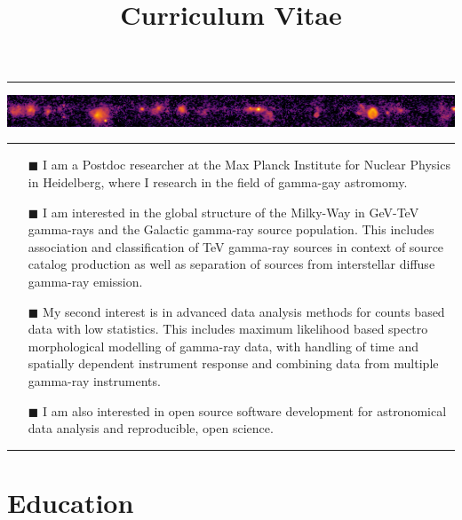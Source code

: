 \documentclass[11pt,a4paper,sans]{moderncv}        %
\title{Curriculum Vitae}                               %
\begin{document}
\makecvtitle

\centering\textcolor{color1}{\rule{\textwidth}{1pt}}
\vspace*{-11pt}\includegraphics[width=\textwidth]{galactic-plane}
\centering\textcolor{color1}{\rule{\textwidth}{1pt}}

\begin{multicols}{2}
\begin{itemize}
\item[\small\textcolor{color1}{$\blacksquare$}] I am a Postdoc researcher at the Max Planck Institute for Nuclear Physics in Heidelberg, where I research in the field of gamma-gay astromomy.
\item[\small\textcolor{color1}{$\blacksquare$}] I am interested in the global structure of the Milky-Way in GeV-TeV gamma-rays and the Galactic gamma-ray source population. This includes association and classification of TeV gamma-ray sources in context of source catalog production as well as separation of sources from interstellar diffuse gamma-ray emission.   
\item[\small\textcolor{color1}{$\blacksquare$}] My second interest is in advanced data analysis methods for counts based data with low statistics. This includes maximum likelihood based spectro morphological modelling of gamma-ray data, with handling of time and spatially dependent instrument response and combining data from multiple gamma-ray instruments. 
\item[\small\textcolor{color1}{$\blacksquare$}] I am also interested in open source software development for astronomical data analysis and reproducible, open science.
\end{itemize}
\end{multicols}

\centering\textcolor{color1}{\rule{\textwidth}{1pt}}

\section{\textbf{Education}}
\end{document}

